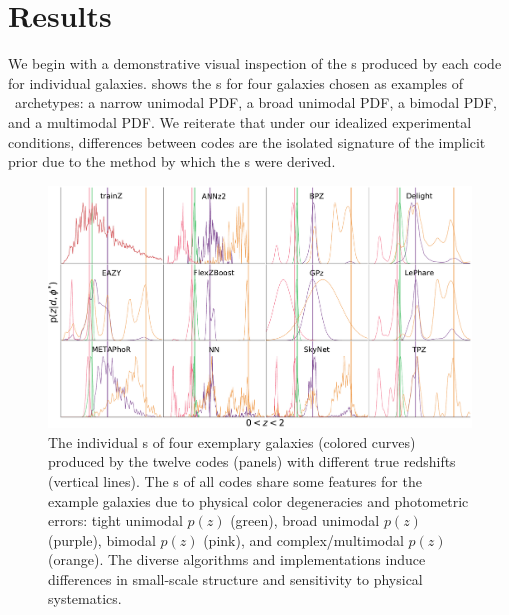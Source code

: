 \section{Results}

We begin with a demonstrative visual inspection of the \pzpdf s produced by each code for individual galaxies.
 shows the \pzpdf s for four galaxies chosen as examples of \pzpdf\ archetypes: a narrow unimodal PDF, a broad unimodal PDF, a bimodal PDF, and a multimodal PDF.
We reiterate that under our idealized experimental conditions, differences between codes are the isolated signature of the implicit prior due to the method by which the \pzpdf s were derived.

\begin{figure}
	\includegraphics[width=\textwidth]{figures/pzdc1/EXAMPLE_pz_12codes_AIM.pdf}
	\caption{The individual \pzpdf s of four exemplary galaxies (colored curves) produced by the twelve codes (panels) with different true redshifts (vertical lines).
		The \pzpdf s of all codes share some features for the example galaxies due to physical color degeneracies and photometric errors: tight unimodal $p(z)$ (green), broad unimodal $p(z)$ (purple), bimodal $p(z)$ (pink), and complex/multimodal $p(z)$ (orange).
		The diverse algorithms and implementations induce differences in small-scale structure and sensitivity to physical systematics.}
\end{figure}

